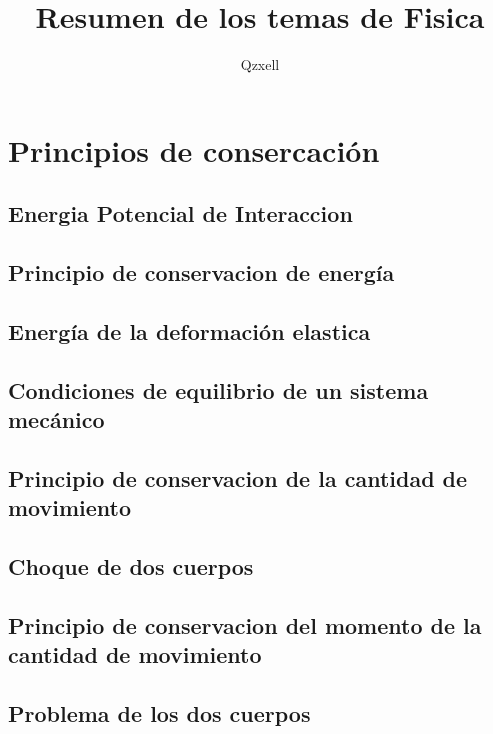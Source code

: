 \documentclass{book}
\author{ Qzxell}
\title{Resumen de los temas de Fisica}
\begin{document}
\maketitle
\tableofcontents
\chapter{Principios de consercaci\'on}
\section{Energia Potencial de Interaccion}

\section{Principio de conservacion de energ\'ia}
	\section{Energ\'ia de la deformaci\'on elastica}
	\section{Condiciones de equilibrio de un sistema mec\'anico}
	\section{Principio de conservacion de la cantidad de movimiento}
	\section{Choque de dos cuerpos}
\section{Principio de conservacion del momento de la cantidad de movimiento}

\section{Problema de los dos cuerpos}
\end{document}
